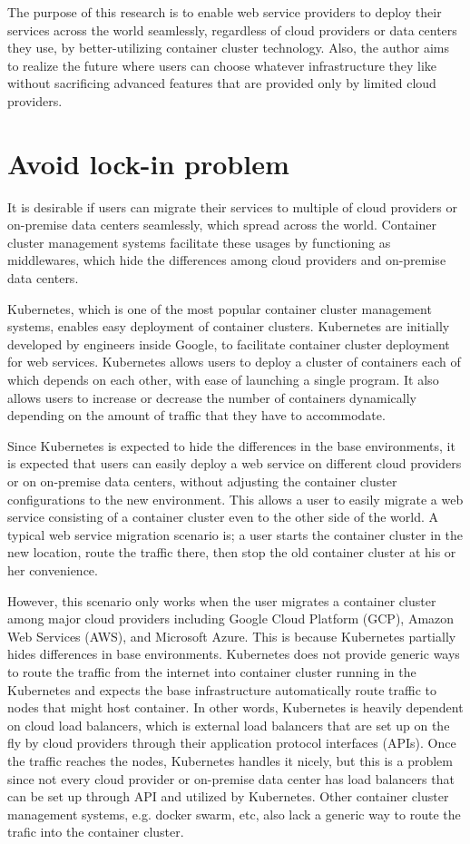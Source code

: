 The purpose of this research is to enable web service providers to deploy their services across the world seamlessly, regardless of cloud providers or data centers they use, by better-utilizing container cluster technology. 
Also, the author aims to realize the future where users can choose whatever infrastructure they like without sacrificing advanced features that are provided only by limited cloud providers.

\section{Avoid lock-in problem}

It is desirable if users can migrate their services to multiple of cloud providers or on-premise data centers seamlessly, which spread across the world.
Container cluster management systems facilitate these usages by functioning as middlewares, which hide the differences among cloud providers and on-premise data centers.

Kubernetes\cite{K8s2017}, which is one of the most popular container cluster management systems, enables easy deployment of container clusters.
Kubernetes are initially developed by engineers inside Google, to facilitate container cluster deployment for web services.
Kubernetes allows users to deploy a cluster of containers each of which depends on each other, with ease of launching a single program.
It also allows users to increase or decrease the number of containers dynamically depending on the amount of traffic that they have to accommodate.

Since Kubernetes is expected to hide the differences in the base environments, it is expected that users can easily deploy a web service on different cloud providers or on on-premise data centers, without adjusting the container cluster configurations to the new environment. 
This allows a user to easily migrate a web service consisting of a container cluster even to the other side of the world.
A typical web service migration scenario is; 
a user starts the container cluster in the new location, route the traffic there, then stop the old container cluster at his or her convenience.

However, this scenario only works when the user migrates a container cluster among major cloud providers including Google Cloud Platform (GCP), Amazon Web Services (AWS), and Microsoft Azure.
This is because Kubernetes partially hides differences in base environments.
Kubernetes does not provide generic ways to route the traffic from the internet into container cluster running in the Kubernetes and expects the base infrastructure automatically route traffic to nodes that might host container.
In other words, Kubernetes is heavily dependent on cloud load balancers, which is external load balancers that are set up on the fly by cloud providers through their application protocol interfaces (APIs).
Once the traffic reaches the nodes, Kubernetes handles it nicely, but this is a problem since not every cloud provider or on-premise data center has load balancers that can be set up through API and utilized by Kubernetes.
Other container cluster management systems, e.g. docker swarm, etc, also lack a generic way to route the trafic into the container cluster.

